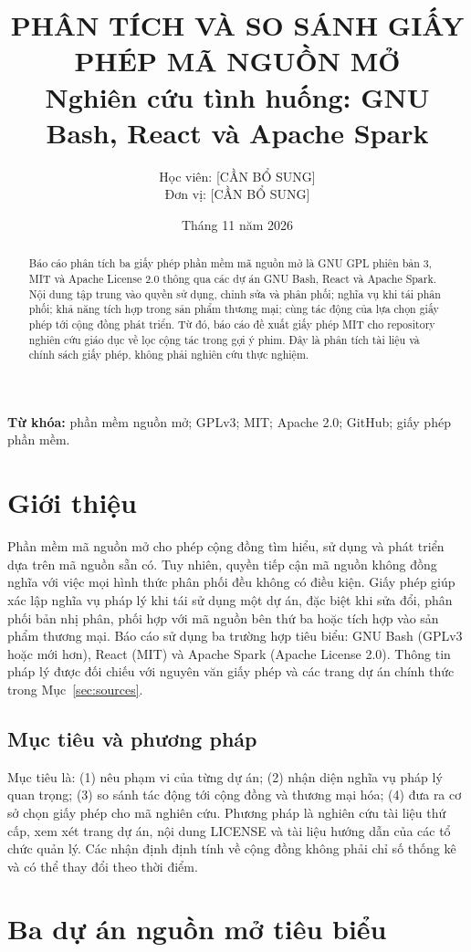 \documentclass[12pt,a4paper]{article}
\title{\textbf{PHÂN TÍCH VÀ SO SÁNH GIẤY PHÉP MÃ NGUỒN MỞ}\\\large Nghiên cứu tình huống: GNU Bash, React và Apache Spark}
\author{Học viên: [CẦN BỔ SUNG] \\ Đơn vị: [CẦN BỔ SUNG]}
\date{Tháng 11 năm 2026}
\begin{document}
\maketitle
\begin{abstract}
Báo cáo phân tích ba giấy phép phần mềm mã nguồn mở là GNU GPL phiên bản 3, MIT và Apache License 2.0 thông qua các dự án GNU Bash, React và Apache Spark. Nội dung tập trung vào quyền sử dụng, chỉnh sửa và phân phối; nghĩa vụ khi tái phân phối; khả năng tích hợp trong sản phẩm thương mại; cùng tác động của lựa chọn giấy phép tới cộng đồng phát triển. Từ đó, báo cáo đề xuất giấy phép MIT cho repository nghiên cứu giáo dục về lọc cộng tác trong gợi ý phim. Đây là phân tích tài liệu và chính sách giấy phép, không phải nghiên cứu thực nghiệm.
\end{abstract}
\noindent\textbf{Từ khóa:} phần mềm nguồn mở; GPLv3; MIT; Apache 2.0; GitHub; giấy phép phần mềm.
\section{Giới thiệu}
Phần mềm mã nguồn mở cho phép cộng đồng tìm hiểu, sử dụng và phát triển dựa trên mã nguồn sẵn có. Tuy nhiên, quyền tiếp cận mã nguồn không đồng nghĩa với việc mọi hình thức phân phối đều không có điều kiện. Giấy phép giúp xác lập nghĩa vụ pháp lý khi tái sử dụng một dự án, đặc biệt khi sửa đổi, phân phối bản nhị phân, phối hợp với mã nguồn bên thứ ba hoặc tích hợp vào sản phẩm thương mại. Báo cáo sử dụng ba trường hợp tiêu biểu: GNU Bash (GPLv3 hoặc mới hơn), React (MIT) và Apache Spark (Apache License 2.0). Thông tin pháp lý được đối chiếu với nguyên văn giấy phép và các trang dự án chính thức trong Mục~\ref{sec:sources}.
\subsection{Mục tiêu và phương pháp}
Mục tiêu là: (1) nêu phạm vi của từng dự án; (2) nhận diện nghĩa vụ pháp lý quan trọng; (3) so sánh tác động tới cộng đồng và thương mại hóa; (4) đưa ra cơ sở chọn giấy phép cho mã nghiên cứu. Phương pháp là nghiên cứu tài liệu thứ cấp, xem xét trang dự án, nội dung LICENSE và tài liệu hướng dẫn của các tổ chức quản lý. Các nhận định định tính về cộng đồng không phải chỉ số thống kê và có thể thay đổi theo thời điểm.
\section{Ba dự án nguồn mở tiêu biểu}
\end{document}
